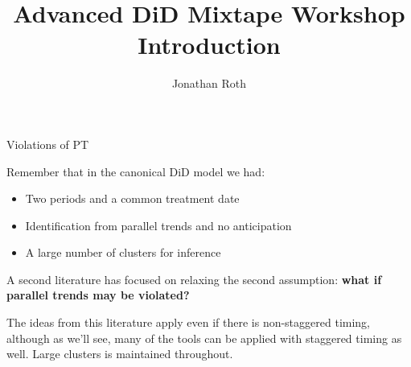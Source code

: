 \documentclass[aspectratio = 169, 13pt]{beamer}
\author{Jonathan Roth}
\title[Advanced DiD Mixtape Workshop]{Advanced DiD Mixtape Workshop \\ Introduction}
\begin{document}


\begin{frame}{Violations of PT}
	\begin{wideitemize}
		\item
		Remember that in the canonical DiD model we had:
		    
		\begin{itemize}
			\item 
			      Two periods and a common treatment date
			              
			\item
			      Identification from parallel trends and no anticipation
			              
			\item
			      A large number of clusters for inference
		\end{itemize}
		    
		\item
		A second literature has focused on relaxing the second assumption: \textbf{what if parallel trends may be violated?}
		    
		\item
		The ideas from this literature apply even if there is non-staggered timing, although as we'll see, many of the tools can be applied with staggered timing as well. Large clusters is maintained throughout. 
		    
	\end{wideitemize}
	
\end{frame}
\end{document}
